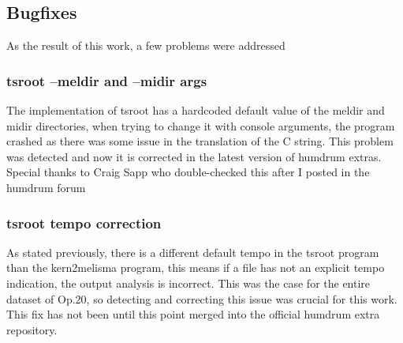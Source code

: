 	\subsection{Bugfixes}
  As the result of this work, a few problems were addressed
		\subsubsection{tsroot --meldir and --midir args}
    The implementation of tsroot has a hardcoded default value of the meldir and midir directories, when trying to change it with console arguments, the program crashed as there was some issue in the translation of the C string. This problem was detected and now it is corrected in the latest version of humdrum extras. Special thanks to Craig Sapp who double-checked this after I posted in the humdrum forum
		\subsubsection{tsroot tempo correction}
    As stated previously, there is a different default tempo in the tsroot program than the kern2melisma program, this means if a file has not an explicit tempo indication, the output analysis is incorrect. This was the case for the entire dataset of Op.20, so detecting and correcting this issue was crucial for this work. This fix has not been until this point merged into the official humdrum extra repository.
\newpage
